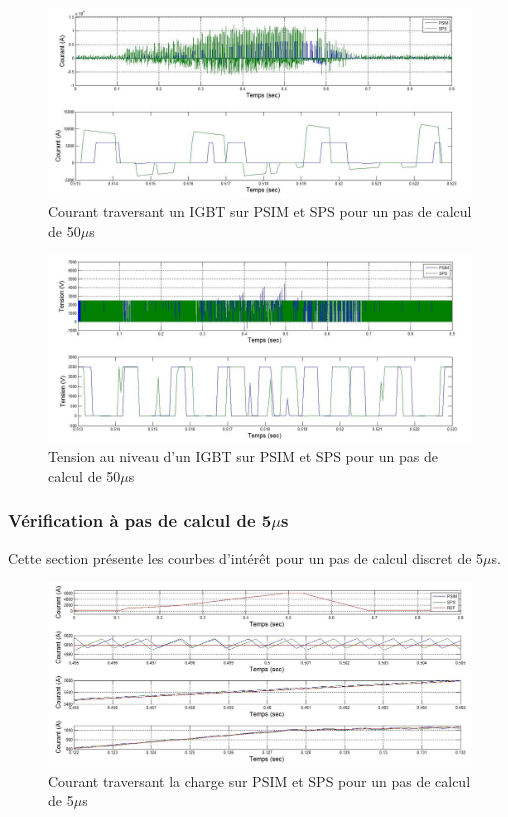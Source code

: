 \documentclass[11pt,letterpaper,final]{report}
\begin{document}
\begin{figure}[htb]
\centering
\includegraphics[scale=0.5]{Fig/DCPDCN/DCPCourantIGBT50u.jpg}
\caption{Courant traversant un IGBT sur PSIM et SPS pour un pas de calcul de 50$\mu$s}
\label{DC_IG_cou_50}
\end{figure}

\begin{figure}[htb]
\centering
\includegraphics[scale=0.5]{Fig/DCPDCN/DCPTensionIGBT50u.jpg}
\caption{Tension au niveau d'un IGBT sur PSIM et SPS pour un pas de calcul de 50$\mu$s}
\label{DC_IG_ten_50}
\end{figure}


\clearpage

\subsubsection{Vérification à pas de calcul de 5$\mu$s}
Cette section présente les courbes d'intérêt pour un pas de calcul discret de 5$\mu$s.

\begin{figure}[htb]
\centering
\includegraphics[scale=0.5]{Fig/DCPDCN/DCPCourantCharge5u.jpg}
\caption{Courant traversant la charge sur PSIM et SPS pour un pas de calcul de 5$\mu$s}
\label{DC_ch_cou_5}
\end{figure}
\end{document}
